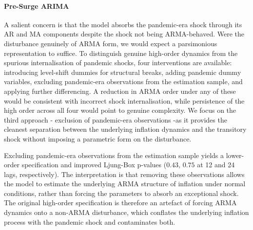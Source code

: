 \paragraph{Pre-Surge ARIMA}

A salient concern is that the model absorbs the pandemic-era shock through its AR and MA components despite the shock not being ARMA-behaved. Were the disturbance genuinely of ARMA form, we would expect a parsimonious representation to suffice. To distinguish genuine high-order dynamics from the spurious internalisation of pandemic shocks, four interventions are available: introducing level-shift dummies for structural breaks, adding pandemic dummy variables, excluding pandemic-era observations from the estimation sample, and applying further differencing. A reduction in ARMA order under any of these would be consistent with incorrect shock internalisation, while persistence of the high order across all four would point to genuine complexity. We focus on the third approach - exclusion of pandemic-era observations -as it provides the cleanest separation between the underlying inflation dynamics and the transitory shock without imposing a parametric form on the disturbance.

Excluding pandemic-era observations from the estimation sample yields a lower-order specification and improved Ljung-Box p-values ($0.43$, $0.75$ at 12 and 24 lags, respectively). The interpretation is that removing these observations allows the model to estimate the underlying ARMA structure of inflation under normal conditions, rather than forcing the parameters to absorb an exceptional shock. The original high-order specification is therefore an artefact of forcing ARMA dynamics onto a non-ARMA disturbance, which conflates the underlying inflation process with the pandemic shock and contaminates both.

